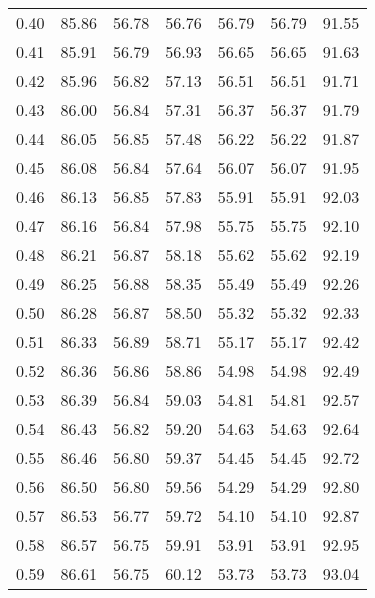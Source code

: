 \begin{tabular}{|c|c|c|c|c|c|c|}
      0.40 &     85.86 &     56.78 &      56.76 &   56.79 &      56.79 &         91.55 \\
      0.41 &     85.91 &     56.79 &      56.93 &   56.65 &      56.65 &         91.63 \\
      0.42 &     85.96 &     56.82 &      57.13 &   56.51 &      56.51 &         91.71 \\
      0.43 &     86.00 &     56.84 &      57.31 &   56.37 &      56.37 &         91.79 \\
      0.44 &     86.05 &     56.85 &      57.48 &   56.22 &      56.22 &         91.87 \\
      0.45 &     86.08 &     56.84 &      57.64 &   56.07 &      56.07 &         91.95 \\
      0.46 &     86.13 &     56.85 &      57.83 &   55.91 &      55.91 &         92.03 \\
      0.47 &     86.16 &     56.84 &      57.98 &   55.75 &      55.75 &         92.10 \\
      0.48 &     86.21 &     56.87 &      58.18 &   55.62 &      55.62 &         92.19 \\
      0.49 &     86.25 &     56.88 &      58.35 &   55.49 &      55.49 &         92.26 \\
      0.50 &     86.28 &     56.87 &      58.50 &   55.32 &      55.32 &         92.33 \\
      0.51 &     86.33 &     56.89 &      58.71 &   55.17 &      55.17 &         92.42 \\
      0.52 &     86.36 &     56.86 &      58.86 &   54.98 &      54.98 &         92.49 \\
      0.53 &     86.39 &     56.84 &      59.03 &   54.81 &      54.81 &         92.57 \\
      0.54 &     86.43 &     56.82 &      59.20 &   54.63 &      54.63 &         92.64 \\
      0.55 &     86.46 &     56.80 &      59.37 &   54.45 &      54.45 &         92.72 \\
      0.56 &     86.50 &     56.80 &      59.56 &   54.29 &      54.29 &         92.80 \\
      0.57 &     86.53 &     56.77 &      59.72 &   54.10 &      54.10 &         92.87 \\
      0.58 &     86.57 &     56.75 &      59.91 &   53.91 &      53.91 &         92.95 \\
      0.59 &     86.61 &     56.75 &      60.12 &   53.73 &      53.73 &         93.04 \\

\end{tabular}
